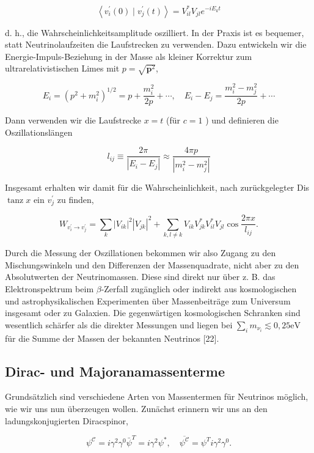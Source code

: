 \documentclass[10pt, letterpaper]{article}
\begin{document}
$$
\left\langle v_{i}^{\prime}(0) \mid v_{j}^{\prime}(t)\right\rangle=V_{i l}^{*} V_{j l} e^{-i E_{k} t}
$$

d. h., die Wahrscheinlichkeitsamplitude oszilliert. In der Praxis ist es bequemer, statt Neutrinolaufzeiten die Laufstrecken zu verwenden. Dazu entwickeln wir die Energie-Impuls-Beziehung in der Masse als kleiner Korrektur zum ultrarelativistischen Limes mit $p=\sqrt{\mathbf{p}^{2}}$,

$$
E_{i}=\left(p^{2}+m_{i}^{2}\right)^{1 / 2}=p+\frac{m_{i}^{2}}{2 p}+\cdots, \quad E_{i}-E_{j}=\frac{m_{i}^{2}-m_{j}^{2}}{2 p}+\cdots
$$

Dann verwenden wir die Laufstrecke $x=t$ (für $c=1$ ) und definieren die Oszillationslängen

$$
l_{i j} \equiv \frac{2 \pi}{\left|E_{i}-E_{j}\right|} \approx \frac{4 \pi p}{\left|m_{i}^{2}-m_{j}^{2}\right|}
$$

Insgesamt erhalten wir damit für die Wahrscheinlichkeit, nach zurückgelegter Dis$\operatorname{tanz} x$ ein $v_{j}^{\prime}$ zu finden,

$$
W_{v_{i}^{\prime} \rightarrow v_{j}^{\prime}}=\sum_{k}\left|V_{i k}\right|^{2}\left|V_{j k}\right|^{2}+\sum_{k, l \neq k} V_{i k} V_{j k}^{*} V_{i l}^{*} V_{j l} \cos \frac{2 \pi x}{l_{i j}} .
$$

Durch die Messung der Oszillationen bekommen wir also Zugang zu den Mischungswinkeln und den Differenzen der Massenquadrate, nicht aber zu den Absolutwerten der Neutrinomassen. Diese sind direkt nur über z. B. das Elektronspektrum beim $\beta$-Zerfall zugänglich oder indirekt aus kosmologischen und astrophysikalischen Experimenten über Massenbeiträge zum Universum insgesamt oder zu Galaxien. Die gegenwärtigen kosmologischen Schranken sind wesentlich schärfer als die direkter Messungen und liegen bei $\sum_{i} m_{\nu_{i}} \lesssim 0,25 \mathrm{eV}$ für die Summe der Massen der bekannten Neutrinos [22].

\subsection*{Dirac- und Majoranamassenterme}
Grundsätzlich sind verschiedene Arten von Massentermen für Neutrinos möglich, wie wir uns nun überzeugen wollen. Zunächst erinnern wir uns an den ladungskonjugierten Diracspinor,

$$
\psi^{\mathcal{C}}=i \gamma^{2} \gamma^{0} \bar{\psi}^{T}=i \gamma^{2} \psi^{*}, \quad \overline{\psi^{\mathcal{C}}}=\psi^{T} i \gamma^{2} \gamma^{0} .
$$
\end{document}
